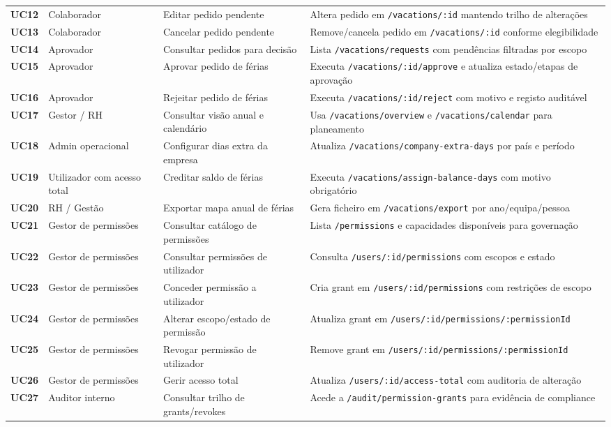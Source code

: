 \documentclass[11pt,a4paper,twoside]{article}
\begin{document}
\begin{longtable}{>{\small\centering\arraybackslash\bfseries}p{0.8cm} >{\small}p{2.4cm} >{\small}p{3.7cm} >{\small}p{6.9cm}}
UC12 & Colaborador & Editar pedido pendente & Altera pedido em \texttt{/vacations/:id} mantendo trilho de alterações \\
UC13 & Colaborador & Cancelar pedido pendente & Remove/cancela pedido em \texttt{/vacations/:id} conforme elegibilidade \\
UC14 & Aprovador & Consultar pedidos para decisão & Lista \texttt{/vacations/requests} com pendências filtradas por escopo \\
UC15 & Aprovador & Aprovar pedido de férias & Executa \texttt{/vacations/:id/approve} e atualiza estado/etapas de aprovação \\
UC16 & Aprovador & Rejeitar pedido de férias & Executa \texttt{/vacations/:id/reject} com motivo e registo auditável \\
UC17 & Gestor / RH & Consultar visão anual e calendário & Usa \texttt{/vacations/overview} e \texttt{/vacations/calendar} para planeamento \\
UC18 & Admin operacional & Configurar dias extra da empresa & Atualiza \texttt{/vacations/company-extra-days} por país e período \\
UC19 & Utilizador com acesso total & Creditar saldo de férias & Executa \texttt{/vacations/assign-balance-days} com motivo obrigatório \\
UC20 & RH / Gestão & Exportar mapa anual de férias & Gera ficheiro em \texttt{/vacations/export} por ano/equipa/pessoa \\
UC21 & Gestor de permissões & Consultar catálogo de permissões & Lista \texttt{/permissions} e capacidades disponíveis para governação \\
UC22 & Gestor de permissões & Consultar permissões de utilizador & Consulta \texttt{/users/:id/permissions} com escopos e estado \\
UC23 & Gestor de permissões & Conceder permissão a utilizador & Cria grant em \texttt{/users/:id/permissions} com restrições de escopo \\
UC24 & Gestor de permissões & Alterar escopo/estado de permissão & Atualiza grant em \texttt{/users/:id/permissions/:permissionId} \\
UC25 & Gestor de permissões & Revogar permissão de utilizador & Remove grant em \texttt{/users/:id/permissions/:permissionId} \\
UC26 & Gestor de permissões & Gerir acesso total & Atualiza \texttt{/users/:id/access-total} com auditoria de alteração \\
UC27 & Auditor interno & Consultar trilho de grants/revokes & Acede a \texttt{/audit/permission-grants} para evidência de compliance \\

\end{longtable}
\end{document}
